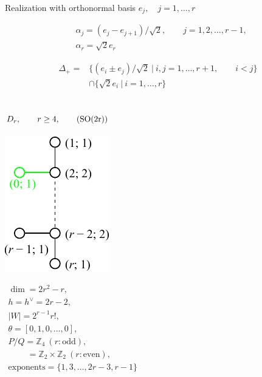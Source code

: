 \documentclass[12pt]{article}
\newcommand{\Zb}{\mathbb{Z}}
\newcommand{\SO}{\rm SO}
\newcommand{\hc}{h^{\vee}}
\begin{document}
Realization with orthonormal basis $e_j,\quad j=1,\dots,r$

\begin{align*}
  &\alpha_{j}=(e_j-e_{j+1})/\sqrt{2},\qquad j=1,2,\dots,r-1,\\
  &\alpha_{r}=\sqrt{2} e_r
\end{align*}

\begin{align*}
 \Delta_{+}=&\{(e_i \pm e_j)/\sqrt{2}\ |\ i,j=1,\dots,r+1,\qquad i<j\} \\
      &\cap
       \{ \sqrt{2}e_{i}\ |\ i=1,\dots,r\}
\end{align*}
\newpage

%
\subsection*{$D_r,\qquad r\ge 4,\qquad (\SO(2r))$}
\parbox{8cm}{\includegraphics{lie_D.pdf}}
$
\begin{array}{l}
 \dim = 2r^2-r, \\
  h=\hc= 2 r-2,\\
 |W|=2^{r-1} r!,\\
 \theta=[0,1,0,\dots,0],\\
 P/Q=\Zb_4\ (r:\text{odd}), \\
  \qquad\    =\Zb_2 \times \Zb_2\ (r:\text{even}),\\
 \text{exponents}={\{1,3,\dots,2r-3,r-1\}}
\end{array}
$
\end{document}
